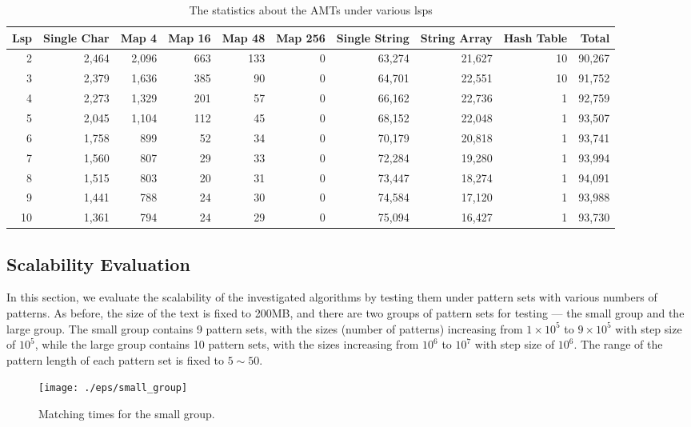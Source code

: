 \begin{table}[!htp]
  \centering
  \caption{The statistics about the AMTs under various lsps}
  \scriptsize
  \label{tab:node types}
  \begin{tabular}{rrrrrrrrrr}
 \hline
 Lsp &
 Single Char &
 Map 4 &
 Map 16 &
 Map 48 &
 Map 256 &
 Single String &
 String Array   &
 Hash Table &
 Total\\
 \hline
 2  & 2,464 & 2,096 & 663 & 133 & 0 & 63,274 &  21,627 & 10 & 90,267\\
 3  & 2,379 & 1,636 & 385 & 90  & 0 & 64,701 &  22,551 & 10 & 91,752\\
 4  & 2,273 & 1,329 & 201 & 57  & 0 & 66,162 &  22,736 &  1 & 92,759\\
 5  & 2,045 & 1,104 & 112 & 45  & 0 & 68,152 &  22,048 &  1 & 93,507\\
 6  & 1,758 &   899 &  52 & 34  & 0 & 70,179 &  20,818 &  1 & 93,741\\
 7  & 1,560 &   807 &  29 & 33  & 0 & 72,284 &  19,280 &  1 & 93,994\\
 8  & 1,515 &   803 &  20 & 31  & 0 & 73,447 &  18,274 &  1 & 94,091\\
 9  & 1,441 &   788 &  24 & 30  & 0 & 74,584 &  17,120 &  1 & 93,988\\
10  & 1,361 &   794 &  24 & 29  & 0 & 75,094 &  16,427 &  1 & 93,730\\
\hline
  \end{tabular}
\end{table}

\subsection{Scalability Evaluation}

In this section, we evaluate the scalability of the investigated
algorithms by testing them under pattern sets with various numbers of
patterns. As before, the size of the text is fixed to 200MB, and there
are two groups of pattern sets for testing --- the small group and the
large group. The small group contains 9 pattern sets, with the sizes
(number of patterns) increasing from $1 \times 10^5$ to
$9 \times 10^5$ with step size of $10^5$, while the large group
contains 10 pattern sets, with the sizes increasing from $10^6$ to
$10^7$ with step size of $10^6$. The range of the pattern length of
each pattern set is fixed to $5 \sim 50$.

\begin{figure}[htbp]
  \centering
  \texttt{[image: ./eps/small\_group]}
  \caption{Matching times for the small group.}
  \label{fig:small_group}
\end{figure}

